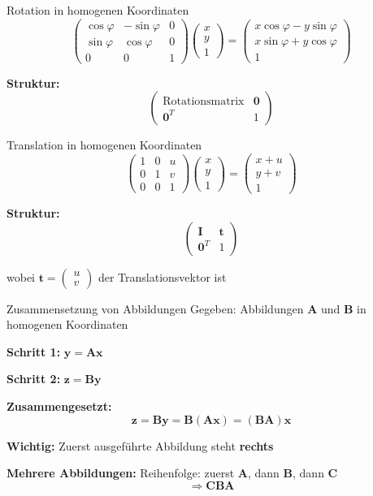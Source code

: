 \documentclass[a4paper, fontsize=7pt]{scrartcl}
\begin{document}
\begin{mainbox}{Rotation in homogenen Koordinaten}
$$\begin{pmatrix} \cos\varphi & -\sin\varphi & 0 \\ \sin\varphi & \cos\varphi & 0 \\ 0 & 0 & 1 \end{pmatrix} \begin{pmatrix} x \\ y \\ 1 \end{pmatrix} = \begin{pmatrix} x\cos\varphi - y\sin\varphi \\ x\sin\varphi + y\cos\varphi \\ 1 \end{pmatrix}$$

\textbf{Struktur:}
$$\begin{pmatrix} \text{Rotationsmatrix} & \mathbf{0} \\ \mathbf{0}^T & 1 \end{pmatrix}$$
\end{mainbox}

\begin{mainbox}{Translation in homogenen Koordinaten}
$$\begin{pmatrix} 1 & 0 & u \\ 0 & 1 & v \\ 0 & 0 & 1 \end{pmatrix} \begin{pmatrix} x \\ y \\ 1 \end{pmatrix} = \begin{pmatrix} x + u \\ y + v \\ 1 \end{pmatrix}$$

\textbf{Struktur:}
$$\begin{pmatrix} \mathbf{I} & \mathbf{t} \\ \mathbf{0}^T & 1 \end{pmatrix}$$

wobei $\mathbf{t} = \begin{pmatrix} u \\ v \end{pmatrix}$ der Translationsvektor ist
\end{mainbox}

\begin{subbox}{Zusammensetzung von Abbildungen}
Gegeben: Abbildungen $\mathbf{A}$ und $\mathbf{B}$ in homogenen Koordinaten

\textbf{Schritt 1:} $\mathbf{y} = \mathbf{Ax}$

\textbf{Schritt 2:} $\mathbf{z} = \mathbf{By}$

\textbf{Zusammengesetzt:}
$$\mathbf{z} = \mathbf{By} = \mathbf{B}(\mathbf{Ax}) = (\mathbf{BA})\mathbf{x}$$

\textbf{Wichtig:} Zuerst ausgeführte Abbildung steht \textbf{rechts}

\textbf{Mehrere Abbildungen:}
Reihenfolge: zuerst $\mathbf{A}$, dann $\mathbf{B}$, dann $\mathbf{C}$
$$\Rightarrow \mathbf{CBA}$$
\end{subbox}
\end{document}
